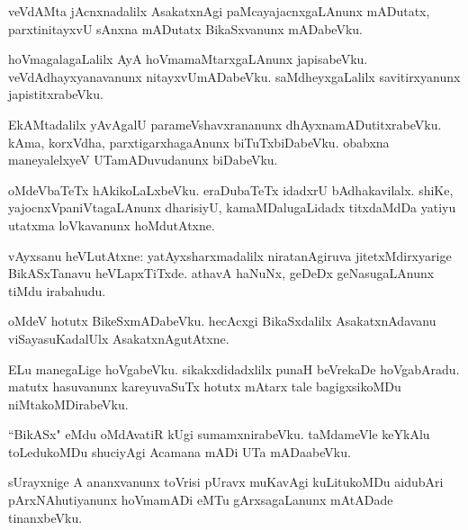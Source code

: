 \documentclass{article}
\begin{document}
\begin{mn}
veVdAMta jAcnxnadalilx AsakatxnAgi paMcayajacnxgaLAnunx mADutatx, parxtinitayxvU sAnxna mADutatx 
BikaSxvanunx mADabeVku.
\end{mn}

\begin{mn}
hoVmagalagaLalilx AyA hoVmamaMtarxgaLAnunx japisabeVku. veVdAdhayxyanavanunx nitayxvUmADabeVku. 
saMdheyxgaLalilx savitirxyanunx japistitxrabeVku.
\end{mn}

\begin{mn}
EkAMtadalilx yAvAgalU parameVshavxrananunx dhAyxnamADutitxrabeVku. kAma, korxVdha, 
parxtigarxhagaAnunx biTuTxbiDabeVku. obabxna maneyalelxyeV UTamADuvudanunx biDabeVku.
\end{mn}

\begin{mn}
oMdeVbaTeTx hAkikoLaLxbeVku. eraDubaTeTx idadxrU bAdhakavilalx. shiKe, yajocnxVpaniVtagaLAnunx 
dharisiyU, kamaMDalugaLidadx titxdaMdDa yatiyu utatxma loVkavanunx hoMdutAtxne.
\end{mn}


\begin{mn}
vAyxsanu heVLutAtxne: yatAyxsharxmadalilx niratanAgiruva jitetxMdirxyarige BikASxTanavu 
heVLapxTiTxde. athavA haNuNx, geDeDx geNasugaLAnunx tiMdu irabahudu.
\end{mn}

\begin{mn}
oMdeV hotutx BikeSxmADabeVku. hecAcxgi BikaSxdalilx AsakatxnAdavanu viSayasuKadalUlx 
AsakatxnAgutAtxne.
\end{mn}

\begin{mn}
ELu manegaLige hoVgabeVku. sikakxdidadxlilx punaH beVrekaDe hoVgabAradu. matutx hasuvanunx 
kareyuvaSuTx hotutx mAtarx tale bagigxsikoMDu  niMtakoMDirabeVku.
\end{mn}

\begin{mn}
``BikASx" eMdu oMdAvatiR kUgi sumamxnirabeVku. taMdameVle keYkAlu toLedukoMDu shuciyAgi Acamana mADi
UTa mADaabeVku.
\end{mn}

\begin{mn}
sUrayxnige A ananxvanunx toVrisi pUravx muKavAgi kuLitukoMDu aidubAri pArxNAhutiyanunx hoVmamADi eMTu
gArxsagaLanunx mAtADade tinanxbeVku.
\end{mn}
\end{document}
